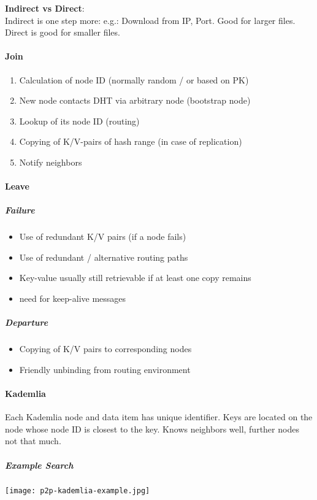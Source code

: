 \textbf{Indirect vs Direct}:\\
Indirect is one step more: e.g.: Download from IP, Port. Good for larger files.\\
Direct is good for smaller files.

\paragraph{Join}
\begin{enumerate}
  \item Calculation of node ID (normally random / or based on PK)
  \item New node contacts DHT via arbitrary node (bootstrap node)
  \item Lookup of its node ID (routing)
  \item Copying of K/V-pairs of hash range (in case of replication)
  \item Notify neighbors
\end{enumerate}

\paragraph{Leave}
\subparagraph{Failure}
\begin{itemize}
  \item Use of redundant K/V pairs (if a node fails)
  \item Use of redundant / alternative routing paths
  \item Key-value usually still retrievable if at least one copy remains
  \item need for keep-alive messages
\end{itemize}
\subparagraph{Departure}
\begin{itemize}
  \item Copying of K/V pairs to corresponding nodes
  \item Friendly unbinding from routing environment
\end{itemize}

\paragraph{Kademlia}
Each Kademlia node and data item has unique identifier.
Keys are located on the node whose node ID is closest to the key.
Knows neighbors well, further nodes not that much.

\subparagraph{Example Search}
\texttt{[image: p2p-kademlia-example.jpg]}

